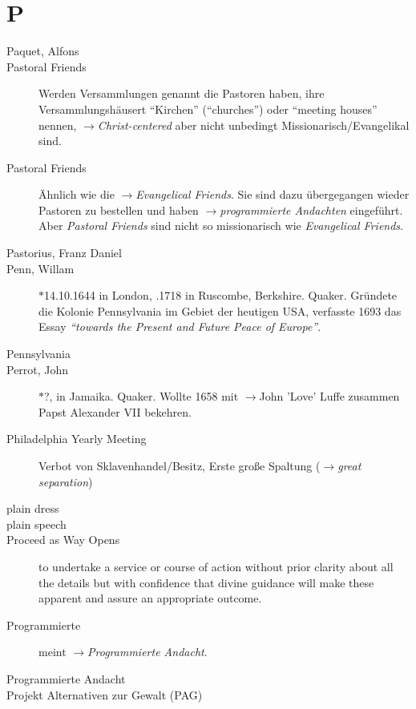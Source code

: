 \section*{P}

\articlesize

\begin{description}

 \item[Paquet, Alfons]

 \item[Pastoral Friends] Werden Versammlungen genannt die Pastoren haben, ihre
 Versammlungshäusert "`Kirchen"' ("`churches"') oder "`meeting houses"' nennen,
 $\to$\textit{Christ-centered} aber nicht unbedingt Missionarisch/Evangelikal
 sind. 

 \item[Pastoral Friends] Ähnlich wie die $\to$\textit{Evangelical Friends}. Sie
 sind dazu übergegangen wieder Pastoren zu bestellen und haben
 $\to$\textit{programmierte Andachten} eingeführt. Aber \textit{Pastoral
 Friends} sind nicht so missionarisch wie \textit{Evangelical Friends}.

 \item[Pastorius, Franz Daniel]

 \item[Penn, Willam] $\ast$14.10.1644 in London, .1718 in Ruscombe,
 Berkshire. Quaker. Gründete die Kolonie Pennsylvania im Gebiet der heutigen
 USA, verfasste 1693 das Essay \textit{"`towards the Present and Future Peace
 of Europe"'}.

  \item[Pennsylvania]

 \item[Perrot, John] $\ast$?,  in Jamaika. Quaker. Wollte 1658 mit
 $\to$John 'Love' Luffe zusammen Papst Alexander VII bekehren.

  \item[Philadelphia Yearly Meeting] Verbot von Sklavenhandel/Besitz, Erste
  große Spaltung ($\to$\textit{great separation})


  \item[plain dress]

  \item[plain speech]

  \item[Proceed as Way Opens]
    to undertake a service or course of action without prior clarity about all the details but with confidence that divine guidance will make these apparent and assure an appropriate outcome.

 \item[Programmierte] meint $\to$\textit{Programmierte Andacht}.

 \item[Programmierte Andacht]

 \item[Projekt Alternativen zur Gewalt (PAG)]

 \end{description}
\normalsize


